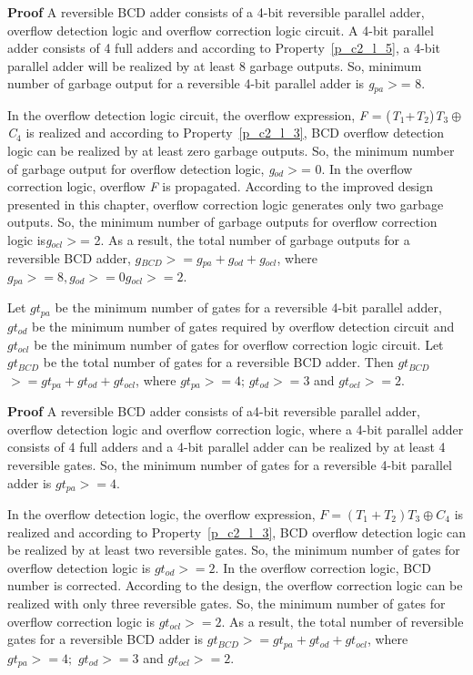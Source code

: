 \noindent\textbf{Proof}
	A reversible BCD adder consists of a 4-bit reversible parallel adder, overflow detection logic and overflow correction logic circuit. A {4}-bit parallel adder consists of 4 full adders and according to Property~\ref{p_c2_l_5}, a {4}-bit parallel adder will be realized by at least 8 garbage outputs. So, minimum number of garbage output for a reversible 4-bit parallel adder is {\it g}${}_{pa}$${>}$= 8.

In the overflow detection logic circuit, the overflow expression, {\it F }= ({\it T}${}_{1}$+{\it T}${}_{2}$){\it T}${}_{3}\oplus$ {\it C}${}_{4}$ is realized and according to Property~\ref{p_c2_l_3}, BCD overflow detection logic can be realized by at least zero garbage outputs. So, the minimum number of garbage output for overflow detection logic, {\it g}${}_{od}$${>}$= 0. In the overflow correction logic, overflow {\it F }is propagated. According to the improved design presented in this chapter, overflow correction logic generates only two garbage outputs. So, the minimum number of garbage outputs for overflow correction logic is{\it g}${}_{ocl}$${>}$= 2.
As a result, the total number of garbage outputs for a reversible BCD adder, $g{}_{BCD}$${>}= g{}_{pa} + g{}_{od} + g{}_{ocl}$, where $g{}_{pa}{>}= 8, g{}_{od}{>}= 0 g{}_{ocl}{>}=  2$.


\begin{property}\label{p_c2_l_7}\textnormal{
	Let $gt_{pa}$ be the minimum number of gates for a reversible 4-bit parallel adder, $gt{}_{od}$ be the minimum number of gates required by overflow detection circuit and $gt{}_{ocl}$ be the minimum number of gates for overflow correction logic circuit. Let $gt{}_{BCD}$ be the total number of gates for a reversible BCD adder. Then	
	$gt{}_{BCD}$${>}= gt{}_{pa}+gt{}_{od}+gt{}_{ocl}$, where $gt{}_{pa}{>}= 4;\, gt{}_{od}{>}= 3$ and $gt{}_{ocl}{>}= 2.$}
\end{property}


\noindent\textbf{Proof}
	A reversible BCD adder consists of a{4}-bit reversible parallel adder, overflow detection logic and overflow correction logic, where a {4}-bit parallel adder consists of 4 full adders and a {4}-bit parallel adder can be realized by at least 4 reversible gates. So, the minimum number of gates for a reversible {4}-bit parallel adder is $gt{}_{pa}$${>}= 4$.


In the overflow detection logic, the overflow expression, $F=(T{}_{1}+T{}_{2})T{}_{3}\oplus C{}_{4}$  is realized and according to Property~\ref{p_c2_l_3}, BCD overflow detection logic can be realized by at least two reversible gates. So, the minimum number of gates for overflow detection logic is $gt{}_{od}{>}= 2$. In the overflow correction logic, BCD number is corrected. According to the design, the overflow correction logic can be realized with only three reversible gates. So, the minimum number of gates for overflow correction logic is $gt{}_{ocl}{>}= 2$.
As a result, the total number of reversible gates for a reversible BCD adder is
$gt{}_{BCD}{>}= gt{}_{pa}+gt{}_{od}+gt{}_{ocl}$, where $gt{}_{pa}{>}= 4;$ $gt{}_{od}{>}= 3$ and $gt{}_{ocl}{>}= 2$.

